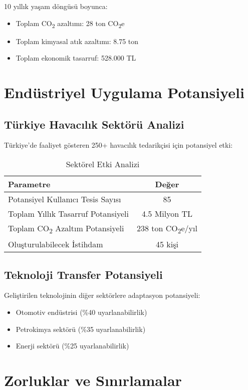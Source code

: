 \documentclass[12pt,a4paper]{article}
\begin{document}
10 yıllık yaşam döngüsü boyunca:
\begin{itemize}
\item Toplam CO\textsubscript{2} azaltımı: 28 ton CO\textsubscript{2}e
\item Toplam kimyasal atık azaltımı: 8.75 ton
\item Toplam ekonomik tasarruf: 528.000 TL
\end{itemize}

\section{Endüstriyel Uygulama Potansiyeli}

\subsection{Türkiye Havacılık Sektörü Analizi}

Türkiye'de faaliyet gösteren 250+ havacılık tedarikçisi için potansiyel etki:

\begin{table}[H]
\centering
\caption{Sektörel Etki Analizi}
\begin{tabular}{lc}
\toprule
\textbf{Parametre} & \textbf{Değer} \\
\midrule
Potansiyel Kullanıcı Tesis Sayısı & 85 \\
Toplam Yıllık Tasarruf Potansiyeli & 4.5 Milyon TL \\
Toplam CO\textsubscript{2} Azaltım Potansiyeli & 238 ton CO\textsubscript{2}e/yıl \\
Oluşturulabilecek İstihdam & 45 kişi \\
\bottomrule
\end{tabular}
\end{table}

\subsection{Teknoloji Transfer Potansiyeli}

Geliştirilen teknolojinin diğer sektörlere adaptasyon potansiyeli:
\begin{itemize}
\item Otomotiv endüstrisi (\%40 uyarlanabilirlik)
\item Petrokimya sektörü (\%35 uyarlanabilirlik)
\item Enerji sektörü (\%25 uyarlanabilirlik)
\end{itemize}

\section{Zorluklar ve Sınırlamalar}
\end{document}
